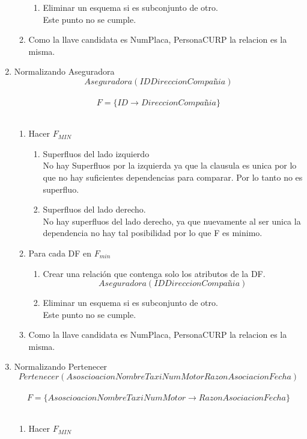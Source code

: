 \documentclass{article}
\begin{document}
\begin{enumerate}
\begin{enumerate}
\begin{enumerate}
					\item Eliminar un esquema si es subconjunto de otro.\\
					Este punto no se cumple.
				\end{enumerate}						
				\item Como la llave candidata es NumPlaca, PersonaCURP la relacion es la misma.
			\end{enumerate}
			\item  Normalizando Aseguradora\\
			$$Aseguradora(ID Direccion Compañia)$$\\
			$$F = \lbrace ID\rightarrow Direccion Compañia\rbrace$$\\
			\begin{enumerate}
				\item Hacer $F_{MIN}$\\
				
				\begin{enumerate}
					\item Superfluos del lado izquierdo\\
					No hay Superfluos por la izquierda ya que la clausula es unica por lo que no hay suficientes dependencias para comparar.
					Por lo tanto no es superfluo.\\
					\item Superfluos del lado derecho.\\
					No hay superfluos del lado derecho, ya que nuevamente al ser unica la dependencia no hay tal posibilidad por lo que F es minimo.
				\end{enumerate}
				\item Para cada DF en $F_{min}$
				\begin{enumerate}
					\item Crear una relación que contenga solo los atributos de la DF.
					$$Aseguradora(ID Direccion Compañia)$$
					
					\item Eliminar un esquema si es subconjunto de otro.\\
					Este punto no se cumple.
				\end{enumerate}						
				\item Como la llave candidata es NumPlaca, PersonaCURP la relacion es la misma.
			\end{enumerate}
			\item  Normalizando Pertenecer \\
			$$Pertenecer(AsoscioacionNombre TaxiNumMotor RazonAsociacion Fecha)$$\\
			$$F = \lbrace AsoscioacionNombre TaxiNumMotor \rightarrow RazonAsociacion Fecha\rbrace$$\\
			\begin{enumerate}
				\item Hacer $F_{MIN}$\\
				

\end{enumerate}
\end{enumerate}
\end{document}
